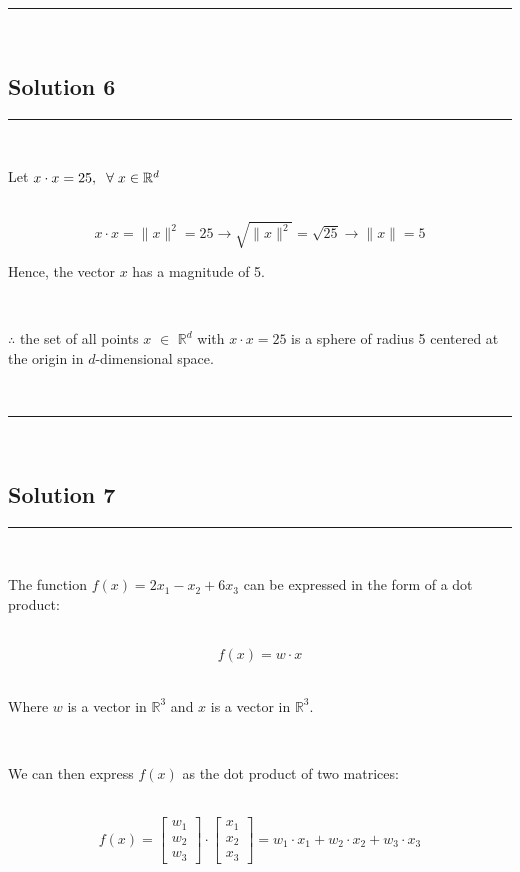 \documentclass{article}
\begin{document}
\noindent\rule{\textwidth}{0.4pt}\\

\newpage

\subsection*{Solution 6}
\noindent\rule{\textwidth}{0.4pt}\\
\parbox{\textwidth}{Let $x\cdot x = 25 ,\hspace{0.2cm} \forall \hspace{0.1cm} x \in \mathbb{R}^{d}$}\\
$$ x\cdot x = \|x\|^2 =25 \rightarrow \sqrt{\|x\|^2} = \sqrt{25} \rightarrow \|x\| = 5$$

\parbox{\textwidth}{Hence, the vector $x$ has a magnitude of 5.}\\

\parbox{\textwidth}{$\therefore$ the set of all points $x$ $\in$ $\mathbb{R}^d$ with $x \cdot x = 25$ is a sphere of radius 5 centered at the origin in $d$-dimensional space.}\\

\noindent\rule{\textwidth}{0.4pt}\\
\newpage
\subsection*{Solution 7}
\noindent\rule{\textwidth}{0.4pt}\\

\parbox{\textwidth}{The function $f(x) = 2x_1 - x_2 + 6x_3$ can be expressed in the form of a dot product:}\\

$$f(x) = w \cdot x$$\\

\parbox{\textwidth}{Where $w$ is a vector in $\mathbb{R}^3$ and $x$ is a vector in $\mathbb{R}^3$.}\\

\parbox{\textwidth}{We can then express $f(x)$ as the dot product of two matrices:}\\

$$f(x) = \begin{bmatrix} w_1 \\ w_2 \\ w_3 \end{bmatrix} \cdot \begin{bmatrix} x_1 \\ x_2 \\ x_3 \end{bmatrix} = w_1\cdot x_1 +w_2\cdot x_2 +w_3\cdot x_3$$
\end{document}
